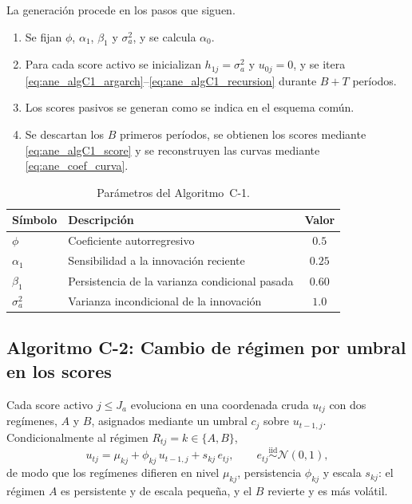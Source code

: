 La generación procede en los pasos que siguen.
\begin{enumerate}
    \item Se fijan $\phi$, $\alpha_1$, $\beta_1$ y $\sigma_a^{2}$, y se calcula $\alpha_0$.

    \item Para cada score activo se inicializan $h_{1j}=\sigma_a^{2}$ y $u_{0j}=0$, y se itera \eqref{eq:ane_algC1_argarch}--\eqref{eq:ane_algC1_recursion} durante $B+T$ períodos.

    \item Los scores pasivos se generan como se indica en el esquema común.

    \item Se descartan los $B$ primeros períodos, se obtienen los scores mediante \eqref{eq:ane_algC1_score} y se reconstruyen las curvas mediante \eqref{eq:ane_coef_curva}.
\end{enumerate}

\begin{table}[H]
\centering
\caption{Parámetros del Algoritmo~C-1.}
\label{tab:ane_algC1}
\begin{tabular}{llc}
\hline
Símbolo & Descripción & Valor \\
\hline
$\phi$          & Coeficiente autorregresivo                          & $0.5$ \\
$\alpha_1$      & Sensibilidad a la innovación reciente               & $0.25$ \\
$\beta_1$       & Persistencia de la varianza condicional pasada      & $0.60$ \\
$\sigma_a^{2}$  & Varianza incondicional de la innovación             & $1.0$ \\
\hline
\end{tabular}
\end{table}

\subsection{Algoritmo C-2: Cambio de régimen por umbral en los scores}
\label{ane_00_02_02_alg_c2}
Cada score activo $j\le J_a$ evoluciona en una coordenada cruda $u_{tj}$ con dos regímenes, $A$ y $B$, asignados mediante un umbral $c_j$ sobre $u_{t-1,j}$. Condicionalmente al régimen $R_{tj}=k\in\{A,B\}$,
\begin{equation}\label{eq:ane_algC2}
    u_{tj}=\mu_{kj}+\phi_{kj}\,u_{t-1,j}+s_{kj}\,e_{tj},
    \qquad
    e_{tj}\overset{\mathrm{iid}}{\sim}\mathcal{N}(0,1),
\end{equation}
de modo que los regímenes difieren en nivel $\mu_{kj}$, persistencia $\phi_{kj}$ y escala $s_{kj}$: el régimen $A$ es persistente y de escala pequeña, y el $B$ revierte y es más volátil.\\

